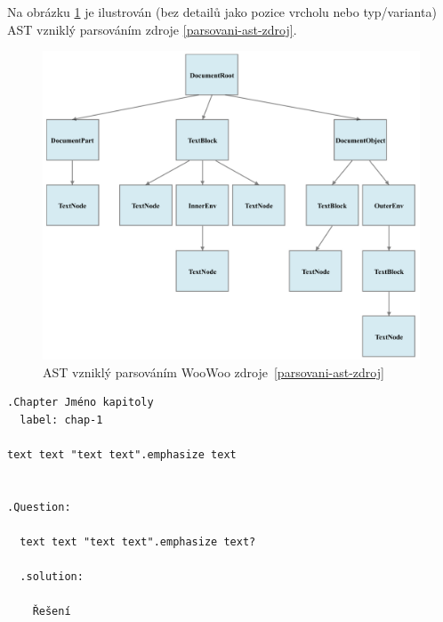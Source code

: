 Na obrázku \ref{parsovani-ast} je ilustrován (bez detailů jako pozice vrcholu nebo typ/varianta) AST vzniklý parsováním
zdroje \ref{parsovani-ast-zdroj}.

\begin{figure}\centering
    \includegraphics[width=1.0\textwidth]{content/realizace/parsování-ast}
 	\caption[WooWoo AST]{AST vzniklý parsováním WooWoo zdroje~\ref{parsovani-ast-zdroj}}
    \label{parsovani-ast}
\end{figure}

\begin{listing}
    \caption{WooWoo zdroj, jehož AST je ilustrován na obrázku~\ref{parsovani-ast}}
    \label{parsovani-ast-zdroj}
    \begin{verbatim}
.Chapter Jméno kapitoly
  label: chap-1

text text "text text".emphasize text


.Question:

  text text "text text".emphasize text?

  .solution:

    Řešení
    \end{verbatim}
\end{listing}
